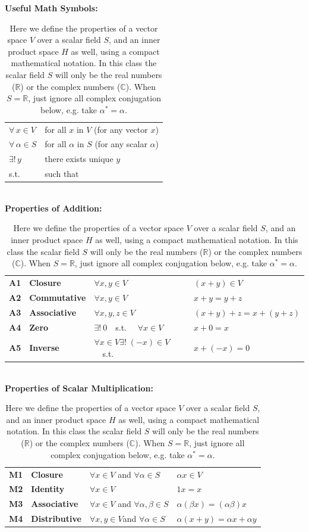 \documentclass[12pt]{book}
\begin{document}
\begin{table}
\caption{ \label{tbl:ipspace} Here we define the properties of a vector space $V$ over a scalar field $S$, and an inner product space $H$ as well, using a compact mathematical notation.  In this class the scalar field $S$ will only be the real numbers ($\mathbb{R}$) or the complex numbers ($\mathbb{C}$).
When $S=\mathbb{R}$, just ignore all complex conjugation below, e.g. take $\alpha^* = \alpha$.}
\begin{center}
{\bf Useful Math Symbols:}\\
\begin{tabular}{ll}
  $\forall \, x \in V$ & for all $x$ in $V$ (for any vector $x$)\\
  $\forall \, \alpha \in S$ & for all $\alpha$ in $S$ (for any scalar $\alpha$) \\
  $\exists ! \, y$ & there exists unique $y$ \\
  s.t.          & such that \\
\end{tabular}\\    
\vskip 0.5cm
{\bf Properties of Addition:}\\
\begin{tabular}{llll}
{\bf A1} & {\bf Closure} & $\forall x,y \in V$ & $(x+y) \in V $\\
{\bf A2} & {\bf Commutative} & $\forall x,y \in V$ & $x+y=y+z$\\
{\bf A3} & {\bf Associative} & $\forall x,y,z \in V$ & $(x+y)+z = x+(y+z)$\\
{\bf A4} & {\bf Zero}        & $\exists !~0$~~s.t.~~ $\forall x \in V$ & $x+0 = x$ \\
{\bf A5} & {\bf Inverse} & $\forall x \in V \exists !\;(-x) \in V$~~s.t.~~& $x+(-x)=0$\\
\end{tabular} \\
\vskip 0.5cm
{\bf Properties of Scalar Multiplication:}\\
\begin{tabular}{llll}
  {\bf M1} & {\bf Closure} & $\forall x \in V$ and $\forall \alpha \in S$ & $\alpha x \in V$\\
  {\bf M2} & {\bf Identity} & $\forall x \in V$ & $1x=x$\\
  {\bf M3} & {\bf Associative} & $\forall x \in V$
and $\forall \alpha,\beta \in S$ & $\alpha(\beta x) = (\alpha \beta) x$\\
{\bf M4} & {\bf Distributive} & $\forall x,y \in V$and $\forall \alpha \in S$ & $\alpha(x+y) = \alpha x + \alpha y$ \\

\end{tabular}
\end{center}
\end{table}
\end{document}
